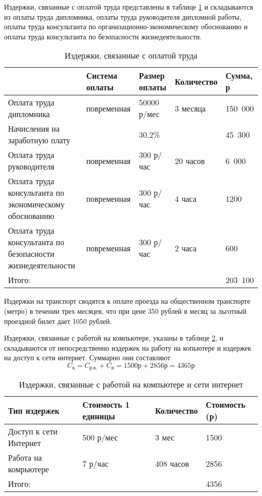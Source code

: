 Издержки, связанные с оплатой труда представлены в таблице \ref{costs-salary}
и складываются из оплаты труда дипломника, оплаты труда руководителя дипломной работы, оплаты труда консультанта по организационно-экономическому обоснованию и оплаты труда консультанта по безопасности жизнедеятельности.

\begin{table}
\center
\caption{Издержки, связанные с оплатой труда}
\label{costs-salary}
\begin{tabular}{|p{4cm}|p{3cm}|p{2cm}|p{2.5cm}|p{2cm}|}
\hline 
 & Система оплаты & Размер оплаты & Количество & Сумма, р \\ 
\hline 
Оплата труда дипломника & повременная & 50000 р/мес & 3 месяца & 150~000 \\ 
\hline
Начисления на заработную плату &  & 30.2\% & & 45~300\\ 
\hline 
Оплата труда руководителя & повременная & 300 р/час & 20 часов & 6~000 \\ 
\hline 
Оплата труда консультанта по экономическому обоснованию & повременная & 300 р/час & 4 часа & 1200 \\ 
\hline 
Оплата труда консультанта по безопасности жизнедеятельности & повременная & 300 р/час & 2 часа & 600 \\ 
\hline 
Итого:  &  &  &  & 203~100 \\ 
\hline 
\end{tabular}
\end{table}

Издержки на транспорт сводятся к оплате проезда на общественном транспорте (метро) в течении трех месяцев, что при цене 350 рублей в месяц за льготный проездной билет дает 1050 рублей.

Издержки, связанные с работой на компьютере, указаны в таблице \ref{costs-computer},
и складываются от непосредственно издержек на работу на копьютере и издержек на 
доступ к сети интернет. Суммарно они составляют
$$ C_{к}= C_{р.к.} + C_{и} = 1500 р + 2856 р = 4365 р $$

\begin{table}
\center
\caption{Издержки, связанные с работой на компьютере и сети интернет}
\label{costs-computer}
\begin{tabular}{|p{3cm}|p{3cm}|p{3cm}|p{3cm}|}
\hline 
Тип издержек & Стоимость 1 единицы & Количество & Стоимость (р) \\ 
\hline 
Доступ к сети Интернет & 500 р/мес & 3 мес & 1500 \\ 
\hline
Работа на комрьютере & 7 р/час & 408 часов & 2856\\ 
\hline 
Итого:  &  &  & 4356 \\ 
\hline
\end{tabular}
\end{table}

